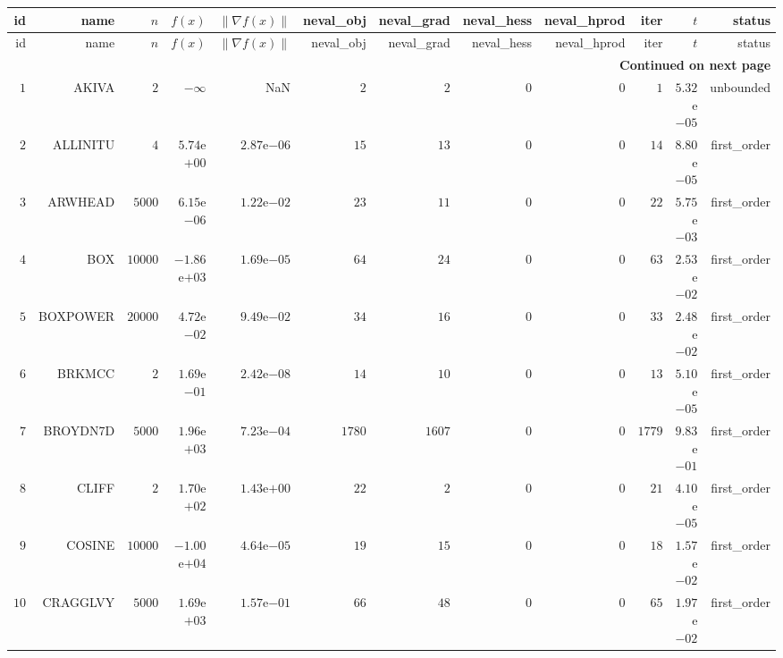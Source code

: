 \begin{longtable}{rrrrrrrrrrrr}
  \hline
  id & name & \(n\) & \(f(x)\) & \(\|\nabla f(x)\|\) & neval\_obj & neval\_grad & neval\_hess & neval\_hprod & iter & \(t\) & status \\\hline
  \endfirsthead
  \hline
  id & name & \(n\) & \(f(x)\) & \(\|\nabla f(x)\|\) & neval\_obj & neval\_grad & neval\_hess & neval\_hprod & iter & \(t\) & status \\\hline
  \endhead
  \hline
  \multicolumn{12}{r}{{\bfseries Continued on next page}}\\
  \hline
  \endfoot
  \endlastfoot
  \(     1\) & AKIVA & \(     2\) & \(-\infty\) &       NaN & \(     2\) & \(     2\) & \(     0\) & \(     0\) & \(     1\) & \( 5.32\)e\(-05\) & unbounded \\
  \(     2\) & ALLINITU & \(     4\) & \( 5.74\)e\(+00\) & \( 2.87\)e\(-06\) & \(    15\) & \(    13\) & \(     0\) & \(     0\) & \(    14\) & \( 8.80\)e\(-05\) & first\_order \\
  \(     3\) & ARWHEAD & \(  5000\) & \( 6.15\)e\(-06\) & \( 1.22\)e\(-02\) & \(    23\) & \(    11\) & \(     0\) & \(     0\) & \(    22\) & \( 5.75\)e\(-03\) & first\_order \\
  \(     4\) & BOX & \( 10000\) & \(-1.86\)e\(+03\) & \( 1.69\)e\(-05\) & \(    64\) & \(    24\) & \(     0\) & \(     0\) & \(    63\) & \( 2.53\)e\(-02\) & first\_order \\
  \(     5\) & BOXPOWER & \( 20000\) & \( 4.72\)e\(-02\) & \( 9.49\)e\(-02\) & \(    34\) & \(    16\) & \(     0\) & \(     0\) & \(    33\) & \( 2.48\)e\(-02\) & first\_order \\
  \(     6\) & BRKMCC & \(     2\) & \( 1.69\)e\(-01\) & \( 2.42\)e\(-08\) & \(    14\) & \(    10\) & \(     0\) & \(     0\) & \(    13\) & \( 5.10\)e\(-05\) & first\_order \\
  \(     7\) & BROYDN7D & \(  5000\) & \( 1.96\)e\(+03\) & \( 7.23\)e\(-04\) & \(  1780\) & \(  1607\) & \(     0\) & \(     0\) & \(  1779\) & \( 9.83\)e\(-01\) & first\_order \\
  \(     8\) & CLIFF & \(     2\) & \( 1.70\)e\(+02\) & \( 1.43\)e\(+00\) & \(    22\) & \(     2\) & \(     0\) & \(     0\) & \(    21\) & \( 4.10\)e\(-05\) & first\_order \\
  \(     9\) & COSINE & \( 10000\) & \(-1.00\)e\(+04\) & \( 4.64\)e\(-05\) & \(    19\) & \(    15\) & \(     0\) & \(     0\) & \(    18\) & \( 1.57\)e\(-02\) & first\_order \\
  \(    10\) & CRAGGLVY & \(  5000\) & \( 1.69\)e\(+03\) & \( 1.57\)e\(-01\) & \(    66\) & \(    48\) & \(     0\) & \(     0\) & \(    65\) & \( 1.97\)e\(-02\) & first\_order \\

\end{longtable}
